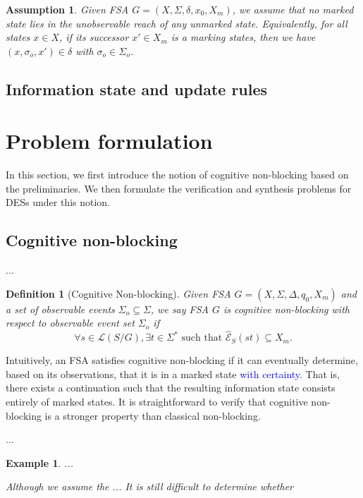 \documentclass{article}
\newcommand{\highlight}[1]{\textcolor{blue}{#1}}
\newtheorem{definition}{Definition}
\newtheorem{example}{Example}
\newtheorem{assumption}{Assumption}
\def\highlight#1{\textcolor{blue}{#1}}
\begin{document}
\begin{assumption}
    Given FSA $G=(X,\Sigma,\delta,x_0,X_m)$, we assume that no marked state lies in the unobservable reach of any unmarked state.
    Equivalently, for all states $x \in X$, if its successor $x' \in X_m$ is a marking states, then we have $(x, \sigma_{o}, x') \in \delta$ with $\sigma_o \in \Sigma_o$.
\end{assumption}

\subsection{Information state and update rules}

%
\section{Problem formulation}\label{sec:prob}

In this section, we first introduce the notion of cognitive non-blocking based on the preliminaries. 
We then formulate the verification and synthesis problems for DESs under this notion.

\subsection{Cognitive non-blocking}

...

\begin{definition}[Cognitive Non-blocking]
    Given FSA $G = (X, \Sigma, \Delta, q_0, X_m)$ and a set of observable events $\Sigma_o \subseteq \Sigma$, we say FSA $G$ is \textit{cognitive non-blocking} with respect to observable event set $\Sigma_o$ if
    $$
    \forall s \in \mathcal{L}(S/G), \exists t \in \Sigma^* \text{ such that } \hat{\mathcal{E}}_S(st) \subseteq X_m.
    $$
\end{definition}

Intuitively, an FSA satisfies cognitive non-blocking if it can eventually determine, based on its observations, that it is in a marked state \highlight{with certainty}. 
That is, there exists a continuation such that the resulting information state consists entirely of marked states.
It is straightforward to verify that cognitive non-blocking is a stronger property than classical non-blocking.

...

\begin{example}
    ...
    
    Although we assume the ...
    It is still difficult to determine whether
    
\end{example}
\end{document}
